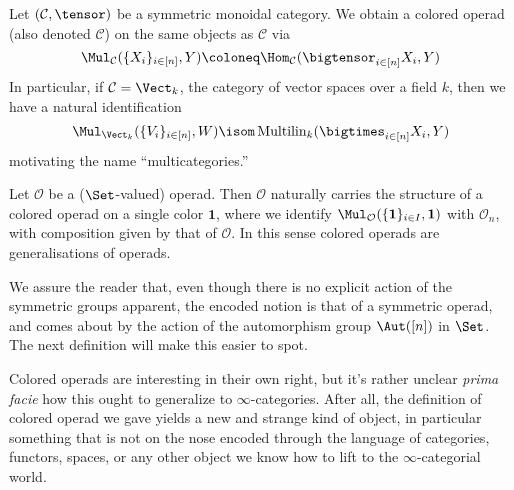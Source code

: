 \documentclass[topology]{bsteffan-notes}
\newcommand{\cC}{{\mathcal{C}}}
\newcommand{\cO}{{\mathcal{O}}}
\begin{document}
\begin{example}
	Let $(\cC, \tensor)$ be a symmetric monoidal category.
	We obtain a colored operad (also denoted $\cC$) on the same objects as $\cC$ via
	\begin{equation*}
		\Mul_\cC(\{X_i\}_{i \in [n]}, Y) \coloneq \Hom_\cC(\bigtensor_{i \in [n]} X_i, Y)
	\end{equation*}
	In particular, if $\cC = \Vect_k$, the category of vector spaces over a field $k$, then we have a natural identification
	\begin{equation*}
		\Mul_{\Vect_k}(\{V_i\}_{i \in [n]}, W) \isom \operatorname{Multilin}_k(\bigtimes_{i \in [n]} X_i, Y)
	\end{equation*}
	motivating the name \enquote{multicategories.}
\end{example}
\begin{example}
	Let $\cO$ be a ($\Set$-valued) operad.
	Then $\cO$ naturally carries the structure of a colored operad on a single color $\mathbf{1}$, where we identify $\Mul_{\cO}(\{\mathbf{1}\}_{i \in I}, \mathbf{1})$ with $\cO_n$, with composition given by that of $\cO$.
	In this sense colored operads are generalisations of operads.
\end{example}
\begin{remark}
	We assure the reader that, even though there is no explicit action of the symmetric groups apparent, the encoded notion is that of a symmetric operad, and comes about by the action of the automorphism group $\Aut([n])$ in $\Set$.
	The next definition will make this easier to spot.
\end{remark}
Colored operads are interesting in their own right, but it's rather unclear \emph{prima facie} how this ought to generalize to $\infty$-categories. 
After all, the definition of colored operad we gave yields a new and strange kind of object, in particular something that is not on the nose encoded through the language of categories, functors, spaces, or any other object we know how to lift to the $\infty$-categorial world.
\end{document}
